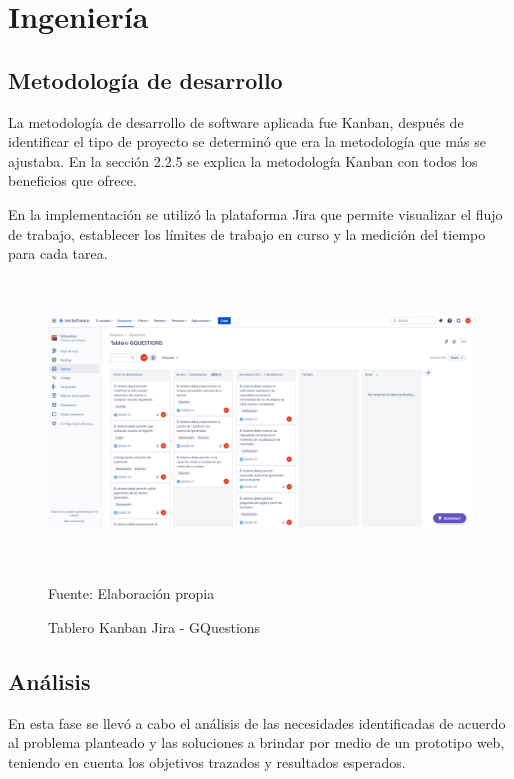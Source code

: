 \documentclass[../Main.tex]{subfiles}
\begin{document}
\section{Ingeniería}
    
    \subsection{Metodología de desarrollo}
    \begin{justify}
    La metodología de desarrollo de software aplicada fue Kanban, después de identificar el tipo de proyecto se determinó que era la metodología que más se ajustaba. En la sección 2.2.5 se explica la metodología Kanban con todos los beneficios que ofrece.
    
    En la implementación se utilizó la plataforma Jira que permite visualizar el flujo de trabajo, establecer los límites de trabajo en curso y la medición del tiempo para cada tarea.
    \end{justify}
    
    \begin{figure}[H]
	\begin{Center}
		\includegraphics[width=6.4in,height=3in]{Images/TableroJira.png}
	    \caption{Tablero Kanban Jira - GQuestions}
	    Fuente: Elaboración propia
        \label{fig:section}
	\end{Center}
    \end{figure}
    
    
    \subsection{Análisis}
    \begin{justify}
    En esta fase se llevó a cabo el análisis de las necesidades identificadas de acuerdo al problema planteado y las soluciones a brindar por medio de un prototipo web, teniendo en cuenta los objetivos trazados y resultados esperados.
    \end{justify}
    
\end{document}
